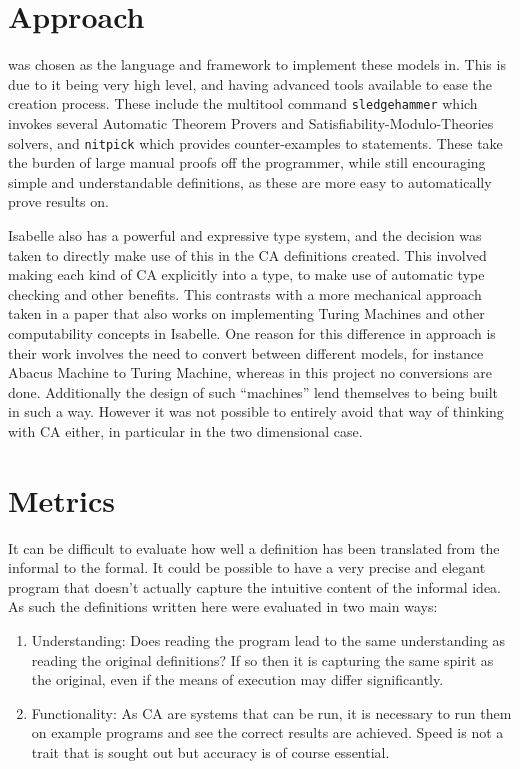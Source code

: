 \section{Approach}

 was chosen as the language and framework to implement these models in.
This is due to it being very high level,
and having advanced tools available to ease the creation process.
These include the multitool command \texttt{sledgehammer} which invokes several Automatic Theorem Provers and Satisfiability-Modulo-Theories solvers, and \texttt{nitpick} which provides counter-examples to statements.
These take the burden of large manual proofs off the programmer,
while still encouraging simple and understandable definitions,
as these are more easy to automatically prove results on.

Isabelle also has a powerful and expressive type system,
and the decision was taken to directly make use of this in the CA definitions created.
This involved making each kind of CA explicitly into a type,
to make use of automatic type checking and other benefits.
This contrasts with a more mechanical approach taken in a paper \cite{urban} that also works on implementing Turing Machines and other computability concepts in Isabelle.
One reason for this difference in approach is their work involves the need to convert between different models, for instance Abacus Machine to Turing Machine,
whereas in this project no conversions are done.
Additionally the design of such ``machines'' lend themselves to being built in such a way.
However it was not possible to entirely avoid that way of thinking with CA either, in particular in the two dimensional case.


\section{Metrics}

It can be difficult to evaluate how well a definition has been translated from the informal to the formal.
It could be possible to have a very precise and elegant program that doesn't actually capture the intuitive content of the informal idea.
As such the definitions written here were evaluated in two main ways:

\begin{enumerate}
    \item Understanding: Does reading the program lead to the same understanding as reading the original definitions?
        If so then it is capturing the same spirit as the original,
        even if the means of execution may differ significantly.
    \item Functionality: As CA are systems that can be run,
        it is necessary to run them on example programs and see the correct results are achieved.
        Speed is not a trait that is sought out but accuracy is of course essential.
\end{enumerate}


